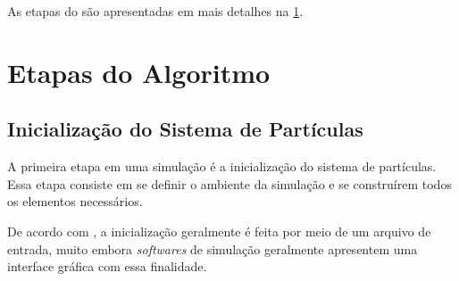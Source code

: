 As etapas do \DEM{} são apresentadas em mais detalhes na \cref{sec:algorithm_steps}.

\section{Etapas do Algoritmo} \label{sec:algorithm_steps}

\subsection{Inicialização do Sistema de Partículas}

A primeira etapa em uma simulação \DEM{} é a inicialização do sistema de partículas. Essa etapa consiste em se definir o ambiente da simulação e se construírem todos os elementos necessários.

De acordo com , a inicialização geralmente é feita por meio de um arquivo de entrada, muito embora \textit{softwares} de simulação geralmente apresentem uma interface gráfica com essa finalidade. 


